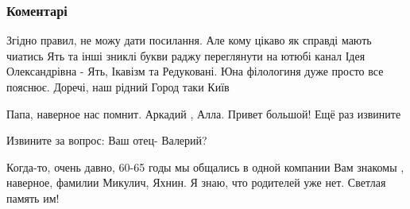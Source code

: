  
 
 
 
 
\subsubsection{Коментарі}

\begin{itemize}
 

Згідно правил, не можу дати посилання. Але кому цікаво як справді мають чиатись
Ять та інші зниклі букви раджу переглянути на ютюбі канал Ідея Олександрівна -
Ять, Ікавізм та Редуковані. Юна філологиня дуже просто все пояснює. Доречі, наш
рідний Город таки Київ \Smiley[1.0][yellow]



 
Папа, наверное нас помнит. Аркадий , Алла. Привет большой! Ещё раз извините

 
Извините за вопрос: Ваш отец- Валерий?

\begin{itemize}
 

Когда-то, очень давно, 60-65 годы мы общались в одной компании Вам знакомы ,
наверное, фамилии Микулич, Яхнин. Я знаю, что родителей уже нет. Светлая память
им!


\end{itemize}
\end{itemize}
